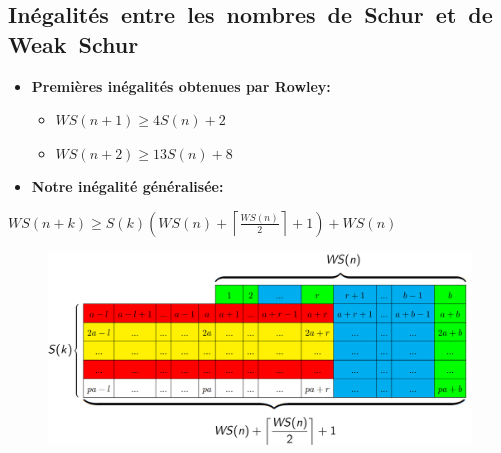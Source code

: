 \documentclass[graphics]{beamer}
\begin{document}
\subsection{Inégalités~entre~les~nombres~de~Schur~et~de~Weak~Schur}


\begin{frame}
	\begin{itemize}
		\item \textbf{Premières inégalités obtenues par Rowley:}
		\vspace{3 mm}
			\begin{itemize}
			\item $WS(n+1) \geqslant 4S(n)+2$
			\item $WS(n+2) \geqslant 13S(n)+8$
			\end{itemize}
		\vspace{5 mm}
		\item \textbf{Notre inégalité généralisée:}
 
			\vspace{2ex}
			\begin{center}
			\end{center}
	\end{itemize}
\end{frame}

\begin{frame}
\begin{center}
$WS (n+k) \geqslant S(k) \left (WS (n) +\left \lceil \displaystyle \frac{WS (n)}{2}
			\right \rceil +1 \right) + WS (n)$
\end{center}

\begin{figure}
        \centering
        \includegraphics[scale=0.7]{tableau.png}
\end{figure}
\end{frame}
\end{document}
